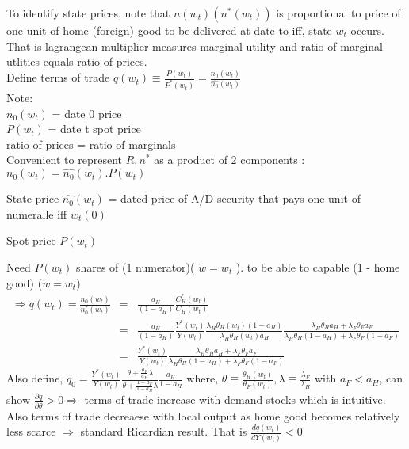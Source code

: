 \documentclass[]{article}
\begin{document}
To identify state prices, note that $n(w_t)(n^*(w_t))$ is proportional to price of one unit of home (foreign) good to be delivered at date to iff, state $w_t$ occurs. That is lagrangean multiplier measures marginal utility and ratio of marginal utlities equals ratio of prices.\\

Define terms of trade $q(w_t) \equiv \frac{P(w_t)}{P^*(w_t)} = \frac{n_0(w_t)}{\hat{n_0} (w_t)}$\\
Note:\\
  $n_0(w_t)$ = date 0 price\\ 
  $P(w_t)$ = date t spot price\\
  ratio of prices = ratio of marginals\\
Convenient to represent $R, n^*$ as a product of 2 components : $n_0(w_t) = \hat{n_0} (w_t). P(w_t)$
\begin{list}{-}{}
\item State price $\hat{n_0} (w_t)$ = dated price of A/D security that pays one unit of numeralle iff $w_t(0)$
\item Spot price $P(w_t)$
\end{list}
Need $P(w_t)$ shares of (1 numerator)( $\tilde{w}= w_t$ ). to be able to capable (1 - home good) ($\tilde{w}= w_t$)\\

\begin{eqnarray*}
\Rightarrow q(w_t) = \frac{n_0(w_t)}{n_0^* (w_t)} &=& \frac{a_H}{(1-a_H)} \frac{C_H^*(w_t)}{C_H(w_t)}\\
&=& \frac{a_H}{(1-a_H)} \frac{Y^*(w_t)}{Y(w_t)} \frac{\lambda_H \theta_H(w_t) (1-a_H)}{\lambda_H \theta_H (w_t) a_H} \frac{\lambda_H \theta_H a_H + \lambda_F \theta_F a_F}{\lambda_H \theta_H (1-a_H) + \lambda_F \theta_F (1-a_F)}\\
&=& \frac{Y^*(w_t)}{Y(w_t)} \frac{\lambda_H \theta_H a_H + \lambda_F \theta_F a_F}{\lambda_H \theta_H (1-a_H) + \lambda_F \theta_F (1-a_F)}
\end{eqnarray*}
Also define, $q_0 = \frac{Y^*(w_t)}{Y(w_t)} \frac{\theta + \frac{a_F}{a_H} \lambda}{\theta + \frac{1-a_F}{1-a_H} \lambda} \frac{a_H}{1-a_H}$ where, $\theta \equiv \frac{\theta_H (w_t)}{\theta_F (w_t)}, \lambda \equiv \frac{\lambda_F}{\lambda_H}$ with $a_F<a_H$, can show $\frac{\partial q}{\partial \theta} > 0 \Rightarrow$ terms of trade increase with demand stocks which is intuitive.\\

Also terms of trade decreaese with local output as home good becomes relatively less scarce $\Rightarrow$ standard Ricardian result. That is $\frac{dq(w_t)}{dY(w_t)}<0$\\
\end{document}
